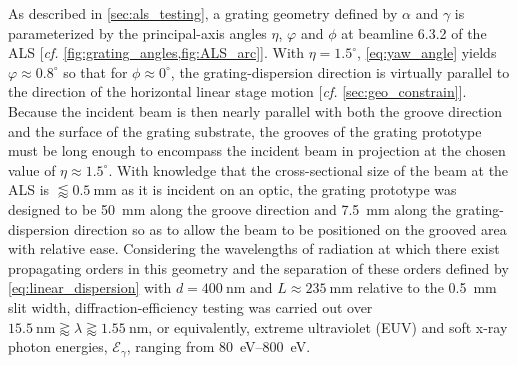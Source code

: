 As described in \cref{sec:als_testing}, a grating geometry defined by $\alpha$ and $\gamma$ is parameterized by the principal-axis angles $\eta$, $\varphi$ and $\phi$ at beamline 6.3.2 of the ALS [\emph{cf.\@} \cref{fig:grating_angles,fig:ALS_arc}]. 
With $\eta = 1.5^{\circ}$, \cref{eq:yaw_angle} yields $\varphi \approx 0.8^{\circ}$ so that for $\phi \approx 0^{\circ}$, the grating-dispersion direction is virtually parallel to the direction of the horizontal linear stage motion [\emph{cf.\@} \cref{sec:geo_constrain}]. 
Because the incident beam is then nearly parallel with both the groove direction and the surface of the grating substrate, the grooves of the grating prototype must be long enough to encompass the incident beam in projection at the chosen value of $\eta \approx 1.5^{\circ}$. 
With knowledge that the cross-sectional size of the beam at the ALS is $\lessapprox \SI{0.5}{\mm}$ as it is incident on an optic, the grating prototype was designed to be \SI{50}{\mm} along the groove direction and \SI{7.5}{\mm} along the grating-dispersion direction so as to allow the beam to be positioned on the grooved area with relative ease. 
Considering the wavelengths of radiation at which there exist propagating orders in this geometry and the separation of these orders defined by \cref{eq:linear_dispersion} with $d = \SI{400}{\nm}$ and $L \approx \SI{235}{\mm}$ relative to the \SI{0.5}{\mm} slit width, diffraction-efficiency testing was carried out over $\SI{15.5}{\nm} \gtrapprox \lambda \gtrapprox \SI{1.55}{\nm}$, or equivalently, extreme ultraviolet (EUV) and soft x-ray photon energies, $\mathcal{E}_{\gamma}$, ranging from \SIrange{80}{800}{\electronvolt}. 

